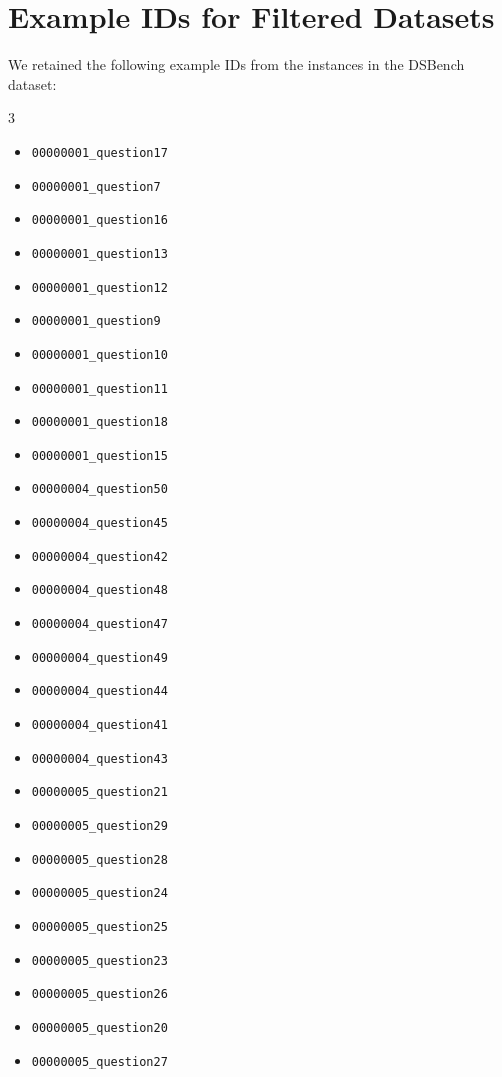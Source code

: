 \newpage
\section{Example IDs for Filtered Datasets}
\label{app:dataset-ids}

We retained the following example IDs from the instances in the DSBench dataset:

\begin{multicols}{3}
    \begin{itemize}[nosep, leftmargin=*]
        \item \texttt{00000001\_question17}
        \item \texttt{00000001\_question7}
        \item \texttt{00000001\_question16}
        \item \texttt{00000001\_question13}
        \item \texttt{00000001\_question12}
        \item \texttt{00000001\_question9}
        \item \texttt{00000001\_question10}
        \item \texttt{00000001\_question11}
        \item \texttt{00000001\_question18}
        \item \texttt{00000001\_question15}
        
        
        
        \item \texttt{00000004\_question50}
        \item \texttt{00000004\_question45}
        \item \texttt{00000004\_question42}
        \item \texttt{00000004\_question48}
        \item \texttt{00000004\_question47}
        \item \texttt{00000004\_question49}
        \item \texttt{00000004\_question44}
        \item \texttt{00000004\_question41}
        \item \texttt{00000004\_question43}
        
        

        \item \texttt{00000005\_question21}
        \item \texttt{00000005\_question29}
        \item \texttt{00000005\_question28}
        \item \texttt{00000005\_question24}
        \item \texttt{00000005\_question25}
        \item \texttt{00000005\_question23}
        \item \texttt{00000005\_question26}
        \item \texttt{00000005\_question20}
        \item \texttt{00000005\_question27}
        

\end{itemize}
\end{multicols}
